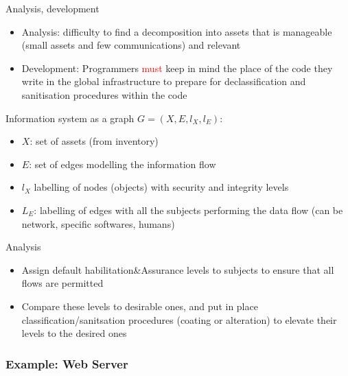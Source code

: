 \begin{reveals}
\begin{frame}
  \vfill

  \begin{block}{Analysis, development}
    \begin{itemize}
    \item Analysis: difficulty to find a decomposition into assets
      that is manageable (small assets and few communications) and
      relevant
    \item Development: Programmers \textcolor{red}{must} keep in mind
      the place of the code they write in the global infrastructure
      to prepare for declassification and sanitisation procedures within the code
    \end{itemize}
  \end{block}

\end{frame}

\begin{frame}

  \begin{block}{Information system as a graph}
    \(G=(X,E,l_X,l_E)\):
    \begin{itemize}
    \item \(X\): set of assets (from inventory)
    \item \(E\): set of edges modelling the information flow
    \item \(l_X\) labelling of nodes (objects) with security and
      integrity levels
    \item \(L_E\): labelling of edges with all the subjects performing
      the data flow (can be network, specific softwares, humans)
    \end{itemize}
  \end{block}

  \vfill

  \begin{block}{Analysis}
    \begin{itemize}
    \item Assign default habilitation\&Assurance levels to subjects to
      ensure that all flows are permitted
    \item Compare these levels to desirable ones, and put in place
      classification/sanitsation procedures (coating or alteration) to
      elevate their levels to the desired ones
    \end{itemize}
  \end{block}
\end{frame}

\begin{frame}[fragile]
  \frametitle{Example: Web Server}
  

\end{frame}
\end{reveals}
